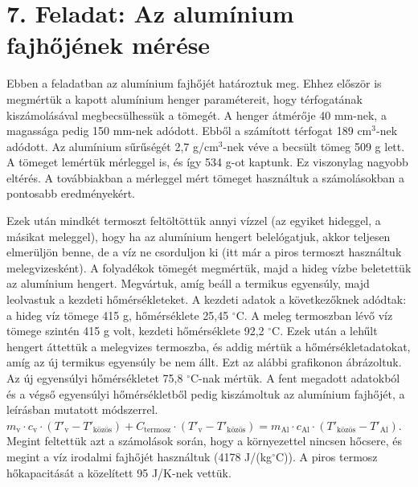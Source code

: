 \documentclass{article}
\begin{document}
\section*{7. Feladat: Az alumínium fajhőjének mérése}

Ebben a feladatban az alumínium fajhőjét határoztuk meg. Ehhez először is megmértük a kapott alumínium henger paramétereit, hogy térfogatának kiszámolásával megbecsülhessük a tömegét. A henger átmérője 40 mm-nek, a magassága pedig 150 mm-nek adódott. Ebből a számított térfogat 189 cm$^3$-nek adódott. Az alumínium sűrűségét 2,7 g/cm$^3$-nek véve a becsült tömeg 509 g lett. A tömeget lemértük mérleggel is, és így 534 g-ot kaptunk. Ez viszonylag nagyobb eltérés. A továbbiakban a mérleggel mért tömeget használtuk a számolásokban a pontosabb eredményekért. 

Ezek után mindkét termoszt feltöltöttük annyi vízzel (az egyiket hideggel, a másikat meleggel), hogy ha az alumínium hengert belelógatjuk, akkor teljesen elmerüljön benne, de a víz ne csorduljon ki (itt már a piros termoszt használtuk melegvizesként). A folyadékok tömegét megmértük, majd a hideg vízbe beletettük az alumínium hengert. Megvártuk, amíg beáll a termikus egyensúly, majd leolvastuk a kezdeti hőmérsékleteket. A kezdeti adatok a következőknek adódtak: a hideg víz tömege 415 g, hőmérséklete 25,45 $^{\circ}$C. A meleg termoszban lévő víz tömege szintén 415 g volt, kezdeti hőmérséklete 92,2 $^{\circ}$C. Ezek után a lehűlt hengert áttettük a melegvizes termoszba, és addig mértük a hőmérsékletadatokat, amíg az új termikus egyensúly be nem állt. Ezt az alábbi grafikonon ábrázoltuk. Az új egyensúlyi hőmérsékletet 75,8 $^{\circ}$C-nak mértük. A fent megadott adatokból és a végső egyensúlyi hőmérsékletből pedig kiszámoltuk az alumínium fajhőjét, a leírásban mutatott módszerrel. 
$m_{\text{v}} \cdot c_{\text{v}} \cdot (T'_{\text{v}} - T'_{\text{közös}}) + C_{\text{termosz}} \cdot (T'_{\text{v}} - T'_{\text{közös}}) = m_{\text{Al}} \cdot c_{\text{Al}} \cdot (T'_{\text{közös}} - T'_{\text{Al}}).$
Megint feltettük azt a számolások során, hogy a környezettel nincsen hőcsere, és megint a víz irodalmi fajhőjét használtuk (4178 J/(kg$^{\circ}$C)). A piros termosz hőkapacitását a közelített 95 J/K-nek vettük. 

\end{document}
